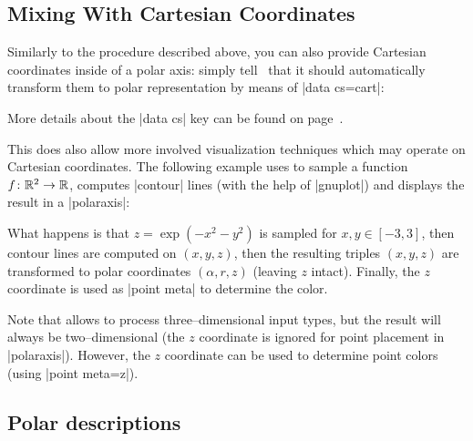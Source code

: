 {\subsection{Mixing With Cartesian Coordinates}
\label{sec:polar:cart}
Similarly to the procedure described above, you can also provide Cartesian coordinates inside of a polar axis: simply tell \PGFPlots\ that it should automatically transform them to polar representation by means of |data cs=cart|:
\begin{codeexample}[]
\end{codeexample}
\noindent More details about the |data cs| key can be found on page~\pageref{key:data:cs}.

This does also allow more involved visualization techniques which may operate on Cartesian coordinates. The following example uses  to sample a function $f\colon \mathbb{R}^2 \to \mathbb{R}$, computes |contour| lines (with the help of |gnuplot|) and displays the result in a |polaraxis|:
\pgfplotsexpensiveexample
\begin{codeexample}[]
\end{codeexample}
\noindent What happens is that $z=\exp(-x^2-y^2)$ is sampled for $x,y \in [-3,3]$, then contour lines are computed on $(x,y,z)$, then the resulting triples $(x,y,z)$ are transformed to polar coordinates $(\alpha,r,z)$ (leaving $z$ intact). Finally, the $z$ coordinate is used as |point meta| to determine the color.

Note that  allows to process three--dimensional input types, but the result will always be two--dimensional (the $z$ coordinate is ignored for point placement in |polaraxis|). However, the $z$ coordinate can be used to determine point colors (using |point meta=z|).

\subsection{Polar descriptions}

}

